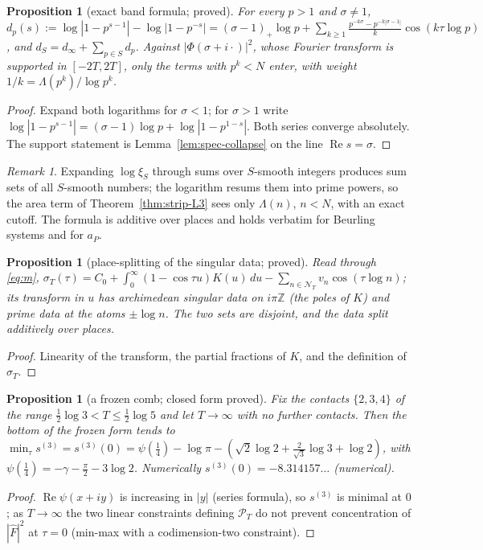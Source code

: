 \documentclass[11pt]{amsart}
\newtheorem{proposition}[theorem]{Proposition}
\theoremstyle{definition}
\theoremstyle{remark}
\newtheorem{remark}[theorem]{Remark}
\newcommand{\Z}{\mathbb Z}
\newcommand{\Rel}{\operatorname{Re}}
\newcommand{\PT}{\mathcal P_T}
\newcommand{\sT}{\sigma_T}
\newcommand{\Fh}{\widehat F}
\newcommand{\NT}{\mathcal N_T}
\begin{document}
\begin{proposition}[exact band formula; proved]\label{prop:strip-Q2}
For every $p>1$ and $\sigma\ne1$,
$d_p(s):=\log|1-p^{s-1}|-\log|1-p^{-s}|=(\sigma-1)_+\log p+\sum_{k\ge1}\frac{p^{-k\sigma}-p^{-k|\sigma-1|}}{k}\cos(k\tau\log p)$, and
$d_S=d_\infty+\sum_{p\in S}d_p$. Against $|\Phi(\sigma+i\cdot)|^2$, whose Fourier transform is supported in $[-2T,2T]$, only the terms
with $p^k<N$ enter, with weight $1/k=\Lambda(p^k)/\log p^k$.
\end{proposition}
\begin{proof}
Expand both logarithms for $\sigma<1$; for $\sigma>1$ write $\log|1-p^{s-1}|=(\sigma-1)\log p+\log|1-p^{1-s}|$. Both series converge
absolutely. The support statement is Lemma~\ref{lem:spec-collapse} on the line $\Rel s=\sigma$.
\end{proof}
\begin{remark}
Expanding $\log\xi_S$ through sums over $S$-smooth integers produces sum sets of all $S$-smooth numbers; the logarithm resums them into
prime powers, so the area term of Theorem~\ref{thm:strip-L3} sees only $\Lambda(n)$, $n<N$, with an exact cutoff. The formula is
additive over places and holds verbatim for Beurling systems and for $a_P$.
\end{remark}

\begin{proposition}[place-splitting of the singular data; proved]\label{prop:strip-S1}
Read through \eqref{eq:m}, $\sT(\tau)=C_0+\int_0^\infty(1-\cos\tau u)K(u)\,du-\sum_{n\in\NT}v_n\cos(\tau\log n)$; its transform in
$u$ has archimedean singular data on $i\pi\Z$ (the poles of $K$) and prime data at the atoms $\pm\log n$. The two sets are disjoint,
and the data split additively over places.
\end{proposition}
\begin{proof}
Linearity of the transform, the partial fractions of $K$, and the definition of $\sT$.
\end{proof}

\begin{proposition}[a frozen comb; closed form proved]\label{prop:strip-S2}
Fix the contacts $\{2,3,4\}$ of the range $\frac12\log3<T\le\frac12\log5$ and let $T\to\infty$ with no further contacts. Then the
bottom of the frozen form tends to $\min_\tau s^{(3)}=s^{(3)}(0)=\psi(\frac14)-\log\pi-(\sqrt2\log2+\frac2{\sqrt3}\log3+\log2)$,
with $\psi(\frac14)=-\gamma-\frac\pi2-3\log2$. Numerically $s^{(3)}(0)=-8.314157\ldots$ (numerical).
\end{proposition}
\begin{proof}
$\Rel\psi(x+iy)$ is increasing in $|y|$ (series formula), so $s^{(3)}$ is minimal at $0$; as $T\to\infty$ the two linear constraints
defining $\PT$ do not prevent concentration of $|\Fh|^2$ at $\tau=0$ (min-max with a codimension-two constraint).
\end{proof}
\end{document}
